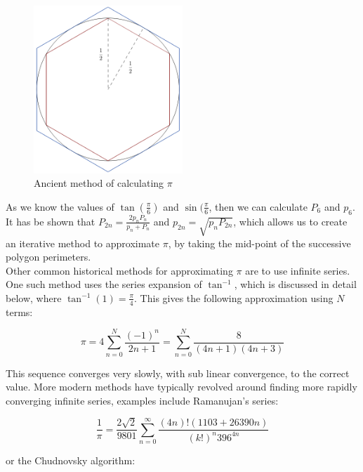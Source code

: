 \begin{figure}[!ht]
	\label{FIG_"Pi Diagram 1"}
	\caption{Ancient method of calculating \(\pi\)}
	\centering
	\includegraphics[width=0.5\textwidth]{"./Diagrams/Pi Diagram 1"}
\end{figure}

As we know the values of \(\tan(\frac{\pi}{6})\) and \(\sin(\frac{\pi}{6}\), then we can calculate \(P_6\) and \(p_6\). It has be shown that \(P_{2n} = \frac{2p_nP_n}{p_n + P_n}\) and \(p_{2n} = \sqrt{p_nP_{2n}}\), which allows us to create an iterative method to approximate \(\pi\), by taking the mid-point of the successive polygon perimeters.\\

Other common historical methods for approximating \(\pi\) are to use infinite series. One such method uses the series expansion of \(\tan^{-1}\), which is discussed in detail below, where \(\tan^{-1}(1) = \frac{\pi}{4}\). This gives the following approximation using \(N\) terms:

\begin{equation}
\label{EQN_"Tan pi Series"}
\pi = 4\sum_{n=0}^{N} \frac{(-1)^n}{2n+1} = \sum_{n=0}^N \frac{8}{(4n+1)(4n+3)}
\end{equation}

This sequence converges very slowly, with sub linear convergence, to the correct value. More modern methods have typically revolved around finding more rapidly converging infinite series, examples include Ramanujan's series:

\begin{equation}
\frac{1}{\pi} = \frac{2\sqrt{2}}{9801}\sum_{n=0}^\infty \frac{(4n)!(1103 + 26390n)}{(k!)^n396^{4n}}
\end{equation}

or the Chudnovsky algorithm:

